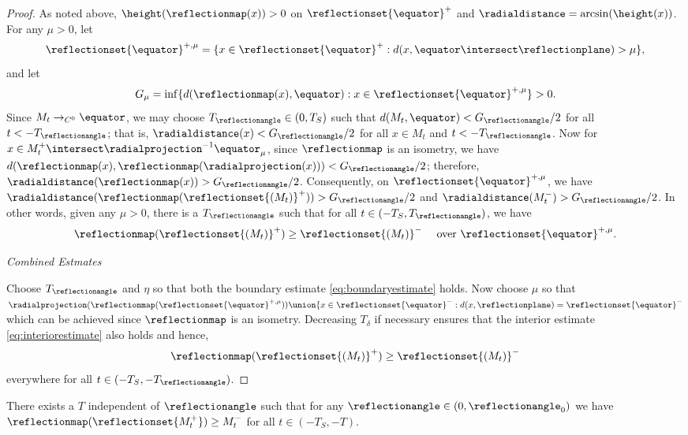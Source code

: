 \documentclass[12pt]{amsart}
\begin{document}
\begin{proof}
As noted above, \(\height(\reflectionmap(x)) > 0\) on \(\reflectionset{\equator}^+\) and \(\radialdistance = \arcsin(\height(x))\). For any \(\mu > 0\), let
\[
\reflectionset{\equator}^{+,\mu} = \{x \in \reflectionset{\equator}^+: d(x, \equator \intersect \reflectionplane) > \mu\},
\]
and let
\[
G_{\mu} = \inf\{d(\reflectionmap(x), \equator) : x \in \reflectionset{\equator}^{+,\mu}\} > 0.
\]
Since \(M_t \to_{C^0} \equator\), we may choose \(T_{\reflectionangle} \in (0, T_S)\) such that \(d(M_t, \equator) < G_{\reflectionangle}/2\) for all \(t < -T_{\reflectionangle}\); that is, \(\radialdistance (x) < G_{\reflectionangle}/2\) for all \(x \in M_t\) and \(t < -T_{\reflectionangle}\). Now for \(x \in M_t^+ \intersect \radialprojection^{-1} \equator_{\mu}\), since \(\reflectionmap\) is an isometry, we have \(d(\reflectionmap(x), \reflectionmap(\radialprojection(x))) < G_{\reflectionangle}/2\); therefore, \(\radialdistance(\reflectionmap(x)) > G_{\reflectionangle}/2\). Consequently, on \(\reflectionset{\equator}^{+,\mu}\), we have \(\radialdistance(\reflectionmap(\reflectionset{(M_t)}^+)) > G_{\reflectionangle}/2\) and \(\radialdistance(M_t^-) > G_{\reflectionangle}/2\). In other words, given any \(\mu>0\), there is a \(T_{\reflectionangle}\) such that for all \(t \in (-T_S,T_{\reflectionangle})\),  we have
\begin{equation}
\label{eq:interiorestimate}
\reflectionmap(\reflectionset{(M_t)}^+) \geq \reflectionset{(M_t)}^- \quad \text{ over } \reflectionset{\equator}^{+,\mu}.
\end{equation}

\emph{Combined Estmates}

Choose \(T_{\reflectionangle}\) and \(\eta\) so that both the boundary estimate \cref{eq:boundaryestimate} holds. Now choose \(\mu\) so that \(\radialprojection(\reflectionmap(\reflectionset{\equator}^{+,\mu})) \union \{x \in \reflectionset{\equator}^- : d(x, \reflectionplane) = \reflectionset{\equator}^-\) which can be achieved since \(\reflectionmap\) is an isometry. Decreasing \(T_{\delta}\) if necessary ensures that the interior estimate \cref{eq:interiorestimate} also holds and hence,
\[
\reflectionmap(\reflectionset{(M_t)}^+) \geq \reflectionset{(M_t)}^-
\]
everywhere for all \(t \in (-T_S, -T_{\reflectionangle})\).
\end{proof}

\begin{lemma}
\label{lem:approximate_symmetrypreserved}
There exists a \(T\) independent of \(\reflectionangle\) such that for any \(\reflectionangle \in (0,\reflectionangle_0)\) we have \(\reflectionmap(\reflectionset{M_t^+}) \geq M_t^-\) for all \(t \in (-T_S, -T)\).
\end{lemma}
\end{document}
